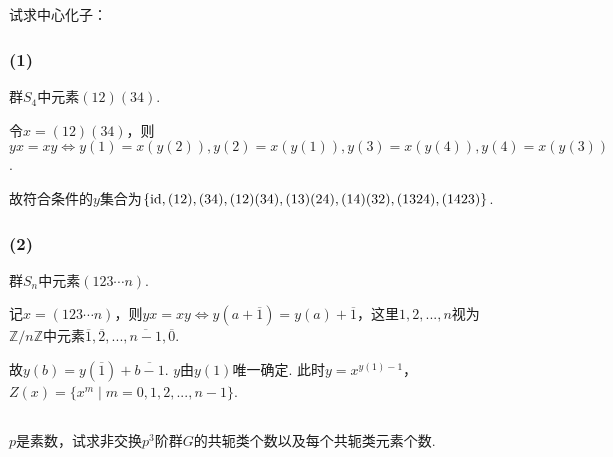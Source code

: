 
\subsection{}
试求中心化子：

\subsubsection{(1)}
群$S_4$中元素$(12)(34)$.

\jie 令$x=(12)(34)$，则$yx=xy\Leftrightarrow y(1)=x(y(2)), y(2)=x(y(1)), y(3)=x(y(4)), y(4)=x(y(3))$.

故符合条件的$y$集合为$\{\operatorname{id}, (12), (34), (12)(34), (13)(24), (14)(32), (1324), (1423)\}$.

\subsubsection{(2)}
群$S_n$中元素$(123\cdots n)$.

\jie 记$x=(123\cdots n)$，则$yx=xy\Leftrightarrow y(a+\overline{1})=y(a)+\overline{1}$，这里$1,2, ..., n$视为$\mathbb{Z}/n\mathbb{Z}$中元素$\overline{1},\overline{2},...,\overline{n-1},\overline{0}$.

故$y(b)=y(\overline{1})+\overline{b-1}$. $y$由$y(1)$唯一确定. 此时$y=x^{y(1)-1}$，$Z(x)=\{x^m\mid m=0,1,2,...,n-1\}$.

\subsection{}
$p$是素数，试求非交换$p^3$阶群$G$的共轭类个数以及每个共轭类元素个数.


